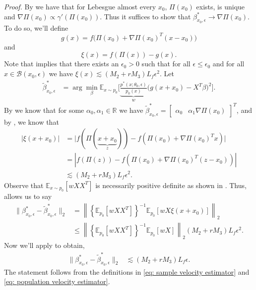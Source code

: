\documentclass[11pt]{article}
\begin{document}
\noindent \textit{Proof.} By  we have that for Lebesgue almost every $x_0$, $\Pi(x_0)$ exists, is unique and $\nabla\Pi(x_0) \propto \gamma'(\Pi(x_0))$. Thus it suffices to show that $\beta^*_{x_0, \epsilon} \rightarrow \nabla\Pi(x_0)$. To do so, we'll define 
\[g(x) = f\Big(\Pi(x_0) + \nabla\Pi(x_0)^{T}(x-x_0)\Big)\]
and 
\[\xi(x) = f(\Pi(x)) - g(x).\] Note that  implies that there exists an $\epsilon_0 > 0$ such that for all $\epsilon \leq \epsilon_0$ and for all $x \in \mathcal{B}(x_0, \epsilon)$ we have $\xi(x) \lesssim (M_2 + rM_3)L_f\epsilon^2$. Let  
\begin{align}
    \tilde{\beta}^*_{x_0, \epsilon} &= \arg\min_{\beta}\mathbb{E}_{x\sim p_0}\Big[\underbrace{\frac{p^*(x;\theta_0, \epsilon)}{p_{0}(x)}}_{w}\Big(g(x+x_0) - X^{T}\beta\Big)^2\Big]. \label{eq: perturbed pop estimator}
\end{align}
By  we know that for some $\alpha_0, \alpha_1 \in \mathbb{R}$ we have $\tilde{\beta}^*_{x_0, \epsilon}  =  \begin{bmatrix}
    \alpha_0 & \alpha_1\nabla\Pi(x_0)
\end{bmatrix}^T$, and by , we know that
\begin{align*}
    \left|\xi(x+x_0)\right| &= \big|f(\Pi(\underbrace{x+x_0}_{z})) - f\left(\Pi(x_0) + \nabla\Pi(x_0)^Tx\right)\big| \\
    &= \left|f(\Pi(z)) - f\left(\Pi(x_0) + \nabla\Pi(x_0)^T(z-x_0)\right)\right|\\
    &\lesssim (M_2 + rM_3)L_f\epsilon^2.
\end{align*}
Observe that $\mathbb{E}_{x\sim p_{0}}[wXX^{T}]$ is necessarily positive definite as shown in . Thus,  allows us to say 
\begin{align*} 
\|\beta^*_{x_0, \epsilon} - \tilde{\beta}_{x_0, \epsilon}^*\|_2 &= \left\|\left\{\mathbb{E}_{p_{0}}[wXX^{T}]\right\}^{-1}\mathbb{E}_{p_{0}}[wX\xi(x+x_0)]\right\|_2 \\
&\leq \left\|\left\{\mathbb{E}_{p_{0}}[wXX^{T}]\right\}^{-1}\mathbb{E}_{p_{0}}[wX]\right\|_2(M_2 + rM_3)L_f\epsilon^2.
\end{align*}
Now we'll apply  to obtain,
\begin{align}
    \|\beta^*_{x_0, \epsilon} - \tilde{\beta}_{x_0, \epsilon}^*\|_2 &\lesssim (M_2 + rM_3)L_f\epsilon.
\end{align}
The statement follows from the definitions in \cref{eq: sample velocity estimator} and \cref{eq: population velocity estimator}. 
\end{document}
